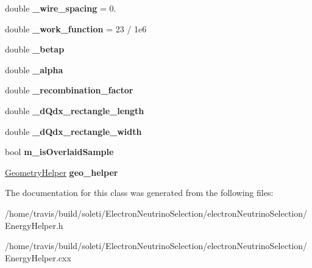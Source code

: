 \begin{DoxyCompactItemize}
\item 
\hypertarget{group__lee_ga412905c2b45aa8103823f84f7bd7ea2a}{double {\bfseries \-\_\-wire\-\_\-spacing} = 0.}\label{group__lee_ga412905c2b45aa8103823f84f7bd7ea2a}

\item 
\hypertarget{group__lee_gafed9eac818bc9ab7f0c0cd3c808feeea}{double {\bfseries \-\_\-work\-\_\-function} = 23 / 1e6}\label{group__lee_gafed9eac818bc9ab7f0c0cd3c808feeea}

\item 
\hypertarget{group__lee_ga6fa094a0561f3185ae9be3cd668a64fb}{double {\bfseries \-\_\-betap}}\label{group__lee_ga6fa094a0561f3185ae9be3cd668a64fb}

\item 
\hypertarget{group__lee_gac748df10e62e8969fd39c85a6c4e1e95}{double {\bfseries \-\_\-alpha}}\label{group__lee_gac748df10e62e8969fd39c85a6c4e1e95}

\item 
\hypertarget{group__lee_gafbe2338334b0bb800473d29350d866d1}{double {\bfseries \-\_\-recombination\-\_\-factor}}\label{group__lee_gafbe2338334b0bb800473d29350d866d1}

\item 
\hypertarget{group__lee_gaffce1a06abee9651a41c454aa5f9032f}{double {\bfseries \-\_\-d\-Qdx\-\_\-rectangle\-\_\-length}}\label{group__lee_gaffce1a06abee9651a41c454aa5f9032f}

\item 
\hypertarget{group__lee_ga227149dafb056c355057c753ac768b13}{double {\bfseries \-\_\-d\-Qdx\-\_\-rectangle\-\_\-width}}\label{group__lee_ga227149dafb056c355057c753ac768b13}

\item 
\hypertarget{group__lee_gaece8ac78e6116f08de723bbc87d33bf9}{bool {\bfseries m\-\_\-is\-Overlaid\-Sample}}\label{group__lee_gaece8ac78e6116f08de723bbc87d33bf9}

\item 
\hypertarget{group__lee_ga613fe58326a28695ad83ddd7bdf8ff57}{\hyperlink{classlee_1_1GeometryHelper}{Geometry\-Helper} {\bfseries geo\-\_\-helper}}\label{group__lee_ga613fe58326a28695ad83ddd7bdf8ff57}

\end{DoxyCompactItemize}


The documentation for this class was generated from the following files\-:\begin{DoxyCompactItemize}
\item 
/home/travis/build/soleti/\-Electron\-Neutrino\-Selection/electron\-Neutrino\-Selection/Energy\-Helper.\-h\item 
/home/travis/build/soleti/\-Electron\-Neutrino\-Selection/electron\-Neutrino\-Selection/Energy\-Helper.\-cxx\end{DoxyCompactItemize}
